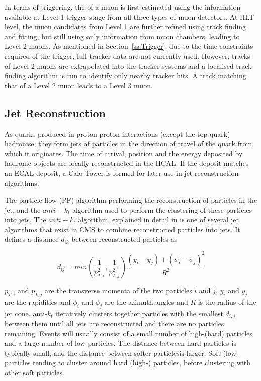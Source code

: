 In terms of triggering, the \pt of a muon is first estimated using the information available at Level 1
trigger stage from all three types of muon detectors. At HLT level, the muon candidates from Level 1 are
further refined using track finding and fitting, but still using only information from muon chambers, leading
to Level 2 muons. As mentioned in Section~\ref{ss:Trigger}, due to the time constraints required of the
trigger, full tracker data are not currently used. However, tracks of Level 2 muons are extrapolated into the
tracker systems and a localised track finding algorithm is run to identify only nearby tracker hits. A
track matching that of a Level 2 muon leads to a Level 3 muon. %

\subsection{Jet Reconstruction}
\label{ss:jet_reconstruction}
As quarks produced in proton-proton interactions (except the top quark) hadronise, they form jets of particles
in the direction of travel of the quark from which it originates. The time of arrival, position and the energy
deposited by hadronic objects are locally reconstructed in the HCAL. If the deposit matches an ECAL deposit, a
Calo Tower is formed for later use in jet reconstruction algorithms.

The particle flow (PF) algorithm performing the reconstruction of particles in the jet, and the $anti-k_{t}$
algorithm used to perform the clustering of these particles into jets. The $anti-k_{t}$ algorithm, explained
in detail in \cite{anti_kt} is one of several jet algorithms that exist in CMS to
combine reconstructed particles into jets. It defines a distance $d_{ik}$ between reconstructed particles as

\begin{equation}
d_{ij} = min(\frac{1}{p_{T,i}^{2}},\frac{1}{p_{T,j}^{2}})\frac{(y_{i}-y_{j})+(\phi_{i}-\phi_{j})^{2}}{R^{2}}
\end{equation}

$p_{T,i}$ and $p_{T,j}$ are the transverse momenta of the two particles $i$ and $j$, $y_{i}$ and $y_{j}$ are
the rapidities and $\phi_{i}$ and $\phi_{j}$ are the azimuth angles and $R$ is the radius of the jet cone.
anti-$k_{t}$ iteratively clusters together particles with the smallest $d_{i,j}$ between them until all jets
are reconstructed and there are no particles remaining. Events will usually consist of a small number of
high-\pt (hard) particles and a large number of low-\pt particles. The distance between hard particles
is typically small, and the distance between softer particlesis larger. Soft (low-\pt particles tending to
cluster around hard (high-\pt) particles, before clustering with other soft particles.


